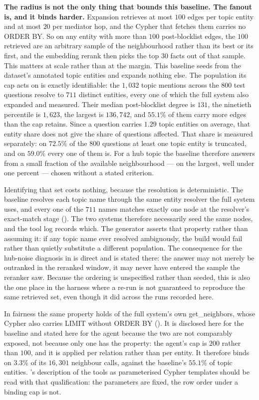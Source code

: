 \textbf{The radius is not the only thing that bounds this baseline. The fanout
is, and it binds harder.} Expansion retrieves at most $100$ edges per topic
entity and at most $20$ per mediator hop, and the Cypher that fetches them
carries no \textsf{ORDER BY}. So on any entity with more than $100$
post-blocklist edges, the $100$ retrieved are an arbitrary sample of the
neighbourhood rather than its best or its first, and the embedding rerank then
picks the top $30$ facts out of that sample. This matters at scale rather than
at the margin. This baseline seeds from the dataset's annotated topic entities
and expands nothing else. The population its cap acts on is exactly
identifiable: the $1{,}032$ topic mentions across the $800$ test questions
resolve to $711$ distinct entities, every one of which the full system also
expanded and measured. Their median post-blocklist degree is $131$, the
ninetieth percentile is $1{,}623$, the largest is $136{,}742$, and $55.1\%$ of
them carry more edges than the cap retains. Since a question carries $1.29$
topic entities on average, that entity share does not give the share of
questions affected. That share is measured separately: on $72.5\%$ of the $800$
questions at least one topic entity is truncated, and on $59.0\%$ every one of
them is. For a hub topic the baseline therefore answers from a small fraction of
the available neighbourhood --- on the largest, well under one percent ---
chosen without a stated criterion.

Identifying that set costs nothing, because the resolution is deterministic. The
baseline resolves each topic name through the same entity resolver the full
system uses, and every one of the $711$ names matches exactly one node at the
resolver's exact-match stage (). The two systems
therefore necessarily seed the same nodes, and the tool log records which. The
generator asserts that property rather than assuming it: if any topic name ever
resolved ambiguously, the build would fail rather than quietly substitute a
different population. The consequence for the hub-noise diagnosis in
 is direct and is stated there: the answer may not merely
be outranked in the reranked window, it may never have entered the sample the
reranker saw. Because the ordering is unspecified rather than seeded, this is
also the one place in the harness where a re-run is not guaranteed to reproduce
the same retrieved set, even though it did across the runs recorded here.

In fairness the same property holds of the full system's own
\textsf{get\_neighbors}, whose Cypher also carries \textsf{LIMIT} without
\textsf{ORDER BY} (). It is disclosed here for the
baseline and stated here for the agent because the two are not comparably
exposed, not because only one has the property: the agent's cap is $200$ rather
than $100$, and it is applied per relation rather than per entity. It therefore
binds on $3.3\%$ of its $16{,}301$ neighbour calls, against the baseline's
$55.1\%$ of topic entities. 's description of the tools as
parameterised Cypher templates should be read with that qualification: the
parameters are fixed, the row order under a binding cap is not.

